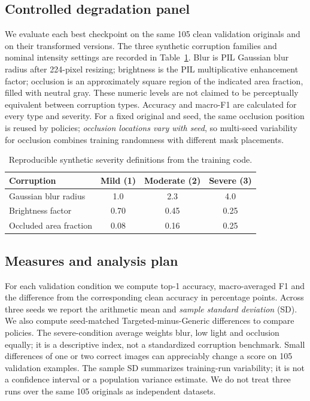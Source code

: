 \documentclass[sigconf,nonacm]{acmart}
\begin{document}
\subsection{Controlled degradation panel}
We evaluate each best checkpoint on the same 105 clean validation originals and on their transformed versions. The three synthetic corruption families and nominal intensity settings are recorded in Table~\ref{tab:corrupt}. Blur is PIL Gaussian blur radius after 224-pixel resizing; brightness is the PIL multiplicative enhancement factor; occlusion is an approximately square region of the indicated area fraction, filled with neutral gray. These numeric levels are not claimed to be perceptually equivalent between corruption types. Accuracy and macro-F1 are calculated for every type and severity. For a fixed original and seed, the same occlusion position is reused by policies; \emph{occlusion locations vary with seed}, so multi-seed variability for occlusion combines training randomness with different mask placements.

\begin{table}[t]
\caption{Reproducible synthetic severity definitions from the training code.}
\label{tab:corrupt}
\small
\begin{tabular}{lccc}
\toprule
Corruption & Mild (1) & Moderate (2) & Severe (3)\\
\midrule
Gaussian blur radius & 1.0 & 2.3 & 4.0\\
Brightness factor & 0.70 & 0.45 & 0.25\\
Occluded area fraction & 0.08 & 0.16 & 0.25\\
\bottomrule
\end{tabular}
\end{table}

\subsection{Measures and analysis plan}
For each validation condition we compute top-1 accuracy, macro-averaged F1 and the difference from the corresponding clean accuracy in percentage points. Across three seeds we report the arithmetic mean and \emph{sample standard deviation} (SD). We also compute seed-matched Targeted-minus-Generic differences to compare policies. The severe-condition average weights blur, low light and occlusion equally; it is a descriptive index, not a standardized corruption benchmark. Small differences of one or two correct images can appreciably change a score on 105 validation examples. The sample SD summarizes training-run variability; it is not a confidence interval or a population variance estimate. We do not treat three runs over the same 105 originals as independent datasets.
\end{document}
